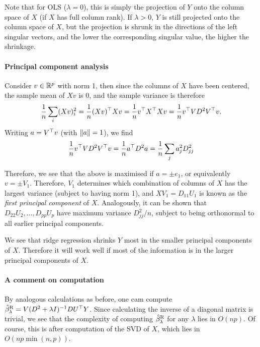 Note that for OLS ($\lambda = 0$), this is simply the projection of $Y$ onto the column space of $X$ (if $X$ has full column rank). If $\lambda > 0$, $Y$ is still projected onto the column space of $X$, but the projection is shrunk in the directions of the left singular vectors, and the lower the corresponding singular value, the higher the shrinkage. 


\paragraph{Principal component analysis} Consider $v \in \mathbb R^p$ with norm 1, then since the columns of $X$ have been centered, the sample mean of $Xv$ is 0, and the sample variance is therefore
\[
\frac1n \sum_i (Xv)_i^2 = \frac1n (Xv)^\top Xv = \frac1n v^\top X^\top X v = \frac1n v^\top VD^2V^\top v. 
\]
Writing $a = V^\top v$ (with $\norm{a} = 1$), we find
\[
\frac1n v^\top VD^2 V^\top v = \frac1n a^\top D^2 a = \frac1n \sum_j a_j^2 D_{jj}^2
\]

Therefore, we see that the above is maximised if $a = \pm e_1$, or equivalently $v = \pm V_1$. Therefore, $V_1$ determines which combination of columns of $X$ has the largest variance (subject to having norm 1), and $XV_1 = D_{11} U_1$ is known as the \emph{first principal component} of $X$. Analogously, it can be shown that $D_{22} U_2, \dotsc, D_{pp} U_p$ have maximum variance $D_{jj}^2 / n$, subject to being orthonormal to all earlier principal components. 

We see that ridge regression shrinks $Y$ most in the smaller principal components of $X$. Therefore it will work well if most of the information is in the larger principal components of $X$. 

\paragraph{A comment on computation}
By analogous calculations as before, one cam compute $\hat\beta_\lambda^\mathrm{R} = V(D^2 + \lambda I)^{-1} DU^\top Y$. Since calculating the inverse of a diagonal matrix is trivial, we see that the complexity of computing $\hat\beta_\lambda^\mathrm{R}$ for any $\lambda$ lies in $O(np)$. Of course, this is after computation of the SVD of $X$, which lies in $O(np \min(n, p))$. 

